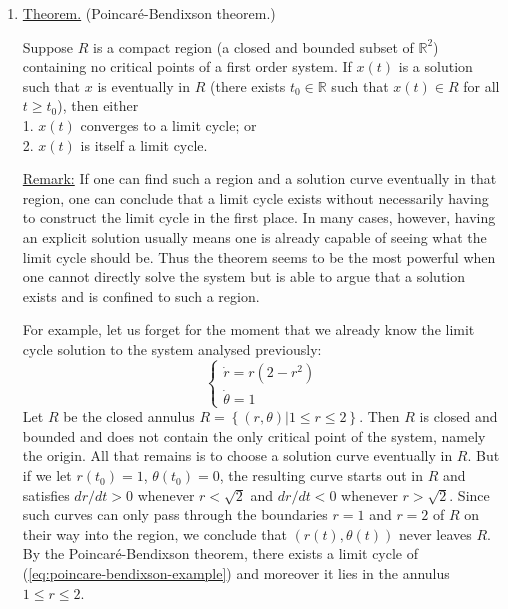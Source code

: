\documentclass[11pt, letterpaper, oneside]{article}     %
\numberwithin{equation}{subsection}
\theoremstyle{definition}
\numberwithin{theorem}{section}
\theoremstyle{remark}
\newcommand{\RR}{\mathbb{R}}
\begin{document}
\begin{enumerate}
  Observe from this qualitative analysis that $r = 1$ is a stable limit cycle, $r = 2$ is semistable, and $r = 3$ is unstable.

  \medskip

\item \underline{Theorem.} (Poincar\'e-Bendixson theorem.)

  Suppose $R$ is a compact region (a closed and bounded subset of $\RR^2$) containing no critical points of a first order system. If $x(t)$ is a solution such that $x$ is eventually in $R$ (there exists $t_0 \in\RR$ such that $x(t) \in R$ for all $t \geq t_0$), then either\\
  1. $x(t)$ converges to a limit cycle; or\\
  2. $x(t)$ is itself a limit cycle.

  \underline{Remark:} If one can find such a region and a solution curve eventually in that region, one can conclude that a limit cycle exists without necessarily having to construct the limit cycle in the first place. In many cases, however, having an explicit solution usually means one is already capable of seeing what the limit cycle should be. Thus the theorem seems to be the most powerful when one cannot directly solve the system but is able to argue that a solution exists and is confined to such a region.

  For example, let us forget for the moment that we already know the limit cycle solution to the system analysed previously:
  \begin{equation}\label{eq:poincare-bendixson-example}
    \begin{cases}
      \dot r = r(2-r^2)\\
      \dot \theta= 1
    \end{cases}
  \end{equation}
  Let $R$ be the closed annulus $R = \left\{(r,\theta)\big|1 \leq r \leq 2 \right\}$. Then $R$ is closed and bounded and does not contain the only critical point of the system, namely the origin. All that remains is to choose a solution curve eventually in $R$. But if we let $r(t_0) = 1$, $\theta(t_0) = 0$, the resulting curve starts out in $R$ and satisfies $dr/dt > 0$ whenever $r < \sqrt{2}$ and $dr/dt < 0$ whenever $r > \sqrt{2}$. Since such curves can only pass through the boundaries $r = 1$ and $r=2$ of $R$ on their way into the region, we conclude that $(r(t),\theta(t))$ never leaves $R$. By the Poincar\'e-Bendixson theorem, there exists a limit cycle of (\ref{eq:poincare-bendixson-example}) and moreover it lies in the annulus $1 \leq r \leq 2$.

\end{enumerate}
\end{document}
